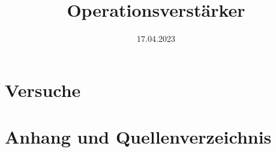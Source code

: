 
\title{Operationsverstärker}
\date{17.04.2023}

    \maketitle
    \newpage
    
    
    \newpage
    \part{Versuche}
    
    \newpage
    
    
    \newpage
    \part{Anhang und Quellenverzeichnis}
    \printbibliography[heading=bibnumbered,title=Referenzen und Literatur]
    
